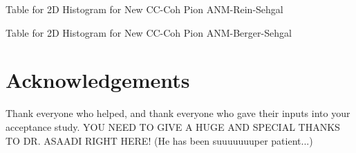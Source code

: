 \documentclass[11pt]{article}
\begin{document}
\newpage
\begin{landscape}
\begin{table}
\centering
\caption{Table for 2D Histogram for New CC-Coh Pion ANM-Rein-Sehgal}
\begin{adjustbox}{width=\paperwidth}
\end{adjustbox}
\end{table}
\end{landscape}

\newpage
\begin{landscape}
\begin{table}
\centering
\caption{Table for 2D Histogram for New CC-Coh Pion ANM-Berger-Sehgal}
\begin{adjustbox}{width=\paperwidth}
\end{adjustbox}
\end{table}
\end{landscape}



\section{Acknowledgements}
Thank everyone who helped, and thank everyone who gave their inputs into your acceptance study. YOU NEED TO GIVE A HUGE AND SPECIAL THANKS TO DR. ASAADI RIGHT HERE! (He has been suuuuuuuper patient...)
\end{document}
